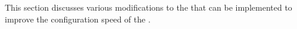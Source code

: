 This section discusses various modifications to the \confignoc{} that can be implemented to improve the configuration speed of the \graicore{}.

\lipsum[1]